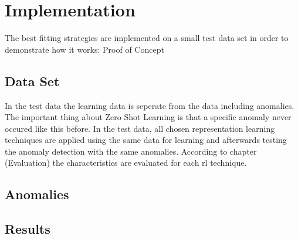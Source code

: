 \chapter{Implementation}\label{implementation}
The best fitting strategies are implemented on a small test data set in order to demonstrate how it works: Proof of Concept\\
\section{Data Set}
In the test data the learning data is seperate from the data including anomalies. The important thing about Zero Shot Learning is that a specific anomaly never occured like this before. In the test data, all chosen representation learning techniques are applied using the same data for learning and afterwards testing the anomaly detection with the same anomalies. According to chapter (Evaluation) the characteristics are evaluated for each rl technique.\\
\section{Anomalies}
\section{Results}
